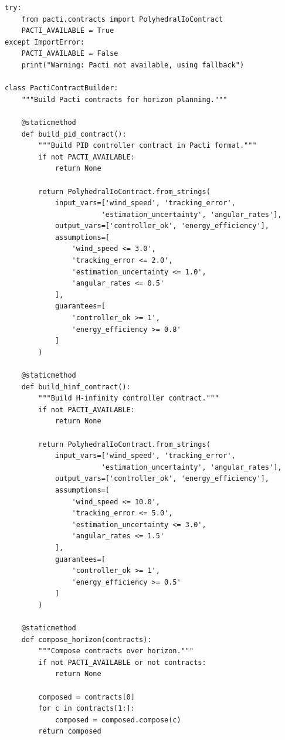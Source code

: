 \begin{lstlisting}[caption={Pacti contract integration (pacti\_contracts.py)}, label=lst:pacti]
try:
    from pacti.contracts import PolyhedralIoContract
    PACTI_AVAILABLE = True
except ImportError:
    PACTI_AVAILABLE = False
    print("Warning: Pacti not available, using fallback")

class PactiContractBuilder:
    """Build Pacti contracts for horizon planning."""

    @staticmethod
    def build_pid_contract():
        """Build PID controller contract in Pacti format."""
        if not PACTI_AVAILABLE:
            return None

        return PolyhedralIoContract.from_strings(
            input_vars=['wind_speed', 'tracking_error',
                       'estimation_uncertainty', 'angular_rates'],
            output_vars=['controller_ok', 'energy_efficiency'],
            assumptions=[
                'wind_speed <= 3.0',
                'tracking_error <= 2.0',
                'estimation_uncertainty <= 1.0',
                'angular_rates <= 0.5'
            ],
            guarantees=[
                'controller_ok >= 1',
                'energy_efficiency >= 0.8'
            ]
        )

    @staticmethod
    def build_hinf_contract():
        """Build H-infinity controller contract."""
        if not PACTI_AVAILABLE:
            return None

        return PolyhedralIoContract.from_strings(
            input_vars=['wind_speed', 'tracking_error',
                       'estimation_uncertainty', 'angular_rates'],
            output_vars=['controller_ok', 'energy_efficiency'],
            assumptions=[
                'wind_speed <= 10.0',
                'tracking_error <= 5.0',
                'estimation_uncertainty <= 3.0',
                'angular_rates <= 1.5'
            ],
            guarantees=[
                'controller_ok >= 1',
                'energy_efficiency >= 0.5'
            ]
        )

    @staticmethod
    def compose_horizon(contracts):
        """Compose contracts over horizon."""
        if not PACTI_AVAILABLE or not contracts:
            return None

        composed = contracts[0]
        for c in contracts[1:]:
            composed = composed.compose(c)
        return composed
\end{lstlisting}

